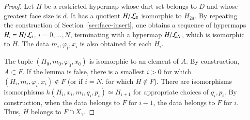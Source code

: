 \begin{proof}  Let $H$ be a restricted hypermap whose dart set belongs to $D$ and whose greatest face size is $d$.  It has a quotient $H/{\cal L}_0$ isomorphic to $H_{2d}$.  By repeating the construction of Section~\ref{sec:face-insert}, one obtains a sequence of hypermaps $H_i = H/{\cal L}_i$, $i=0,\ldots,N$, terminating with a hypermap $H/{\cal L}_N$, which is isomorphic to $H$.  The data $m_i,\varphi_i,x_i$ is also obtained for each $H_i$.

The tuple $(H_0,m_0,\varphi_0,x_0)$ is isomorphic to an element of $A$.   By construction,
$A\subset F$.  If the lemma is false, there is a smallest $i>0$ for which $(H_i,m_i,\varphi_i,x_i)\not\in F$  (or if $i=N$, for which $H\not\in F$).   There are isomorphisms isomorphisms $h(H_i,x_i,m_i,q_i,p_i) \simeq H_{i+1}$ for appropriate choices of $q_i,p_i$.  By construction, when the data belongs to $F$ for $i-1$, the data belongs to $F$ for $i$.  Thus, $H$ belongs to $F\cap X_1$.
\end{proof}

